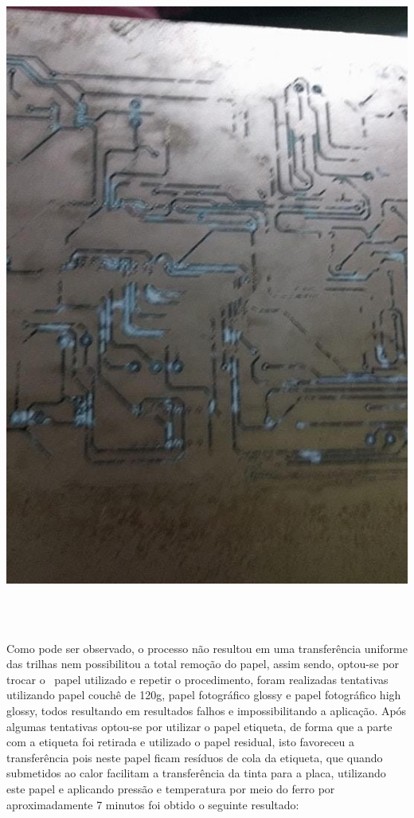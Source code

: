 \begin{center}
    \includegraphics[scale=0.3]{figuras/errada}
       \label{errada}
   \end{center}  

Como pode ser observado, o processo não resultou em uma transferência uniforme das trilhas nem possibilitou a total remoção do papel, assim sendo, optou-se por trocar o  papel utilizado e repetir o procedimento, foram realizadas tentativas utilizando papel couchê de 120g, papel fotográfico glossy e papel fotográfico high glossy, todos resultando em resultados falhos e impossibilitando a aplicação. 
Após algumas tentativas optou-se por utilizar o papel etiqueta, de forma que a parte com a etiqueta foi retirada e utilizado o papel residual, isto favoreceu a transferência pois neste papel ficam resíduos de cola da etiqueta, que quando submetidos ao calor facilitam a transferência da tinta para a placa, utilizando este papel e aplicando pressão e temperatura por meio do ferro por aproximadamente 7 minutos foi obtido o seguinte resultado:

